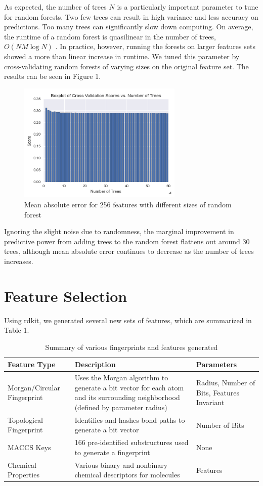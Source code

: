 \documentclass[11pt]{article}
\begin{document}
As expected, the number of trees $N$ is a particularly important parameter to tune for random forests. Two few trees can result in high variance and less accuracy on predictions. Too many trees can significantly slow down computing. On average, the runtime of a random forest is quasilinear in the number of trees, $O(N M\log N)$ \cite{loupe}. In practice, however, running the forests on larger features sets showed a more than linear increase in runtime. We tuned this parameter by cross-validating random forests of varying sizes on the original feature set. The results can be seen in Figure 1. 
\begin{figure}[H]
\centering
\includegraphics[width=0.7\textwidth]{forest_tuning.png}
\caption{Mean absolute error for 256 features with different sizes of random forest}
\label{my-label}
\end{figure}
Ignoring the slight noise due to randomness, the marginal improvement in predictive power from adding trees to the random forest flattens out around 30 trees, although mean absolute error continues to decrease as the number of trees increases. 
\section*{Feature Selection}
Using rdkit, we generated several new sets of features, which are summarized in Table 1. 
\begin{table}[h]
\centering
\begin{tabular}{|p{4cm}|p{8cm}|p{4cm}|}
\hline
\textbf{Feature Type} & \textbf{Description} & \textbf{Parameters} \\ \hline
Morgan/Circular \newline Fingerprint & Uses the Morgan algorithm to generate a bit \newline vector for each atom and its surrounding \newline neighborhood (defined by parameter radius) & Radius, Number of Bits, Features Invariant \\ \hline
Topological Fingerprint & Identifies and hashes bond paths to generate a bit vector & Number of Bits \\ \hline
MACCS Keys & 166 pre-identified substructures used to generate a fingerprint & None \\ \hline
Chemical Properties & Various binary and nonbinary chemical descriptors for molecules & Features \\ \hline
\end{tabular}
\caption{Summary of various fingerprints and features generated}
\label{my-label}
\end{table}
\end{document}
